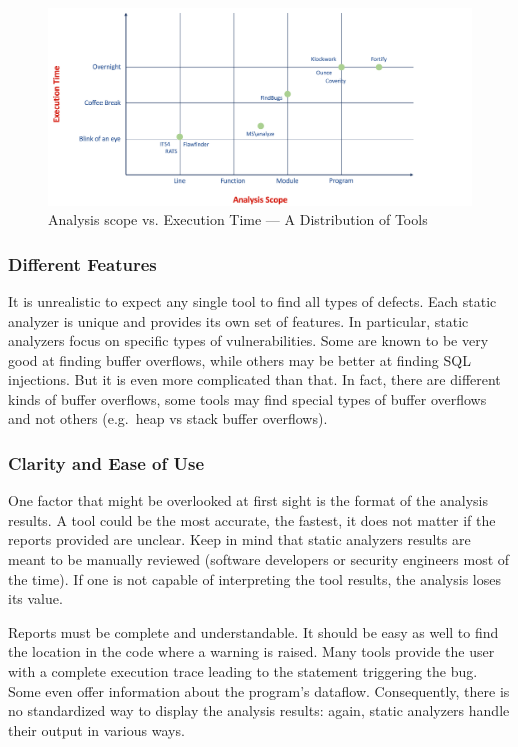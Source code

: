 \vspace{0.5cm}

\begin{figure}[h]
    \centering
    \includegraphics[scale=0.44]{figures/trade-offs}
    \caption{Analysis scope vs. Execution Time --- A Distribution of Tools \cite{chess2007secure}}
    \label{fig:trade-offs}
\end{figure}

\subsubsection{Different Features}

It is unrealistic to expect any single tool to find all types of defects. Each static analyzer is unique and provides its own set of features. In particular, static analyzers focus on specific types of vulnerabilities. Some are known to be very good at finding buffer overflows, while others may be better at finding SQL injections. But it is even more complicated than that. In fact, there are different kinds of buffer overflows, some tools may find special types of buffer overflows and not others (e.g.\ heap vs stack buffer overflows).

\subsubsection{Clarity and Ease of Use}

One factor that might be overlooked at first sight is the format of the analysis results. A tool could be the most accurate, the fastest, it does not matter if the reports provided are unclear. Keep in mind that static analyzers results are meant to be manually reviewed (software developers or security engineers most of the time). If one is not capable of interpreting the tool results, the analysis loses its value.

Reports must be complete and understandable. It should be easy as well to find the location in the code where a warning is raised. Many tools provide the user with a complete execution trace leading to the statement triggering the bug. Some even offer information about the program's dataflow. Consequently, there is no standardized way to display the analysis results: again, static analyzers handle their output in various ways.

